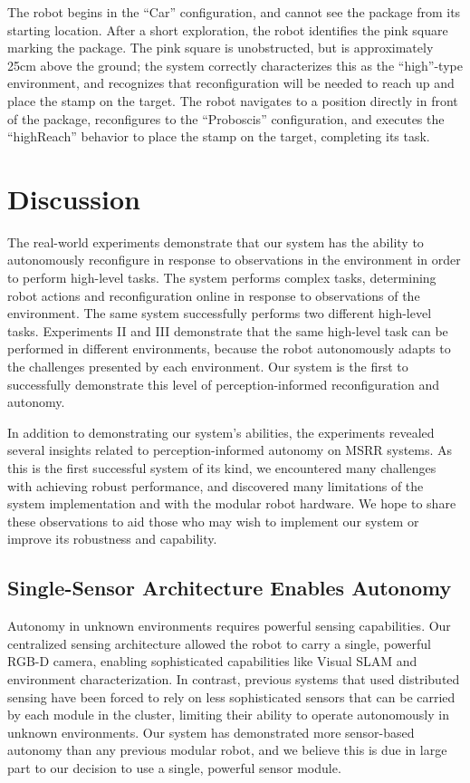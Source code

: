 \documentclass[journal]{IEEEtran}
\begin{document}
The robot begins in the ``Car'' configuration, and cannot see the package from its starting location.  After a short exploration, the robot identifies the pink square marking the package.  The pink square is unobstructed, but is approximately 25cm above the ground; the system correctly characterizes this as the ``high''-type environment, and recognizes that reconfiguration will be needed to reach up and place the stamp on the target.  The robot navigates to a position directly in front of the package, reconfigures to the ``Proboscis'' configuration, and executes the ``highReach'' behavior to place the stamp on the target, completing its task.
%
\section{Discussion}
\label{sec:discussion}
The real-world experiments demonstrate that our system has the ability to autonomously reconfigure in response to observations in the environment in order to perform high-level tasks. The system performs complex tasks, determining robot actions and reconfiguration online in response to observations of the environment. The same system successfully performs two different high-level tasks. Experiments II and III demonstrate that the same high-level task can be performed in different environments, because the robot autonomously adapts to the challenges presented by each environment. Our system is the first to successfully demonstrate this level of perception-informed reconfiguration and autonomy.

In addition to demonstrating our system's abilities, the experiments revealed several insights related to perception-informed autonomy on MSRR systems. As this is the first successful system of its kind, we encountered many challenges with achieving robust performance, and discovered many limitations of the system implementation and with the modular robot hardware. We hope to share these observations to aid those who may wish to implement our system or improve its robustness and capability.
%
\subsection{Single-Sensor Architecture Enables Autonomy}
%
Autonomy in unknown environments requires powerful sensing capabilities.  Our centralized sensing architecture allowed the robot to carry a single, powerful RGB-D camera, enabling sophisticated capabilities like Visual SLAM and environment characterization. In contrast, previous systems that used distributed sensing have been forced to rely on less sophisticated sensors that can be carried by each module in the cluster, limiting their ability to operate autonomously in unknown environments.   Our system has demonstrated more sensor-based autonomy than any previous modular robot, and we believe this is due in large part to our decision to use a single, powerful sensor module.
\end{document}
